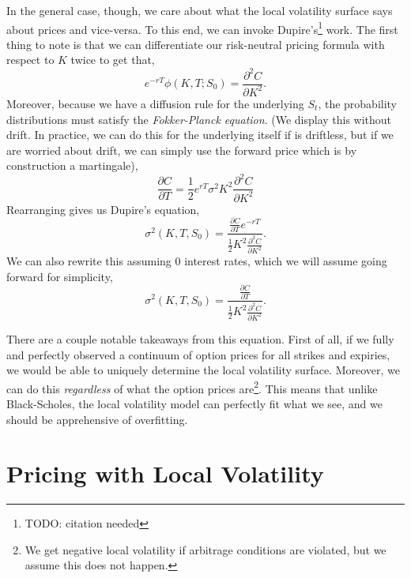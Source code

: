 \documentclass[12pt]{article}
\numberwithin{equation}{section}
\begin{document}
In the general case, though, we care about what the local volatility surface
says about prices and vice-versa. To this end, we can invoke Dupire's\footnote{
TODO: citation needed} work. The first thing to note is that we can
differentiate our risk-neutral pricing formula with respect to $K$ twice to get
that,
\begin{equation}
 e^{-rT} \phi(K, T; S_0) = \frac{\partial^2 C}{\partial K^2}.
\end{equation}
Moreover, because we have a diffusion rule for the underlying $S_t$, the
probability distributions must satisfy 
the \emph{Fokker-Planck equation}. 
(We
display this without drift. In practice, we can do this for the underlying
itself if is driftless, but if we are worried about drift, we can simply use the
forward price which is by construction a martingale),
\begin{equation}
 \frac{\partial C}{\partial T} = \frac{1}{2} e^{rT} \sigma^2 K^2 \frac{\partial^2
C}{\partial K^2}
\end{equation}
Rearranging gives us Dupire's equation,
\begin{equation}
 \sigma^2(K, T, S_0) = \frac{ \frac{\partial C}{\partial T} e^{-rT}}
{\frac{1}{2} K^2 \frac{\partial^2 C}{\partial K^2}}.
\end{equation}
We can also rewrite this assuming 0 interest rates, which we will assume going
forward for simplicity,
\begin{equation}
 \sigma^2(K, T, S_0) = \frac{ \frac{\partial C}{\partial T}}
{\frac{1}{2} K^2 \frac{\partial^2 C}{\partial K^2}}.
\end{equation}

There are a couple notable takeaways from this equation. First of all, if we
fully and perfectly observed a continuum of option prices for all strikes and
expiries, we would be able to uniquely determine the local volatility surface.
Moreover, we can do this \emph{regardless} of what the option prices
are\footnote{We get negative local volatility if arbitrage conditions are violated,
but we assume this does not happen.}. This means that unlike Black-Scholes, the
local volatility model can perfectly fit what we see, and we should be
apprehensive of overfitting.


\section{Pricing with Local Volatility}
\label{sec:localvolpricing}
\end{document}
